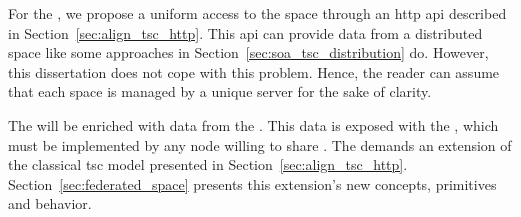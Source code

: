 For the \coordspace{}, we propose a uniform access to the space through an \acs{http} \ac{api} described in Section~\ref{sec:align_tsc_http}.
This \ac{api} can provide data from a distributed space like some approaches in Section~\ref{sec:soa_tsc_distribution} do.
However, this dissertation does not cope with this problem. %
Hence, the reader can assume that each space is managed by a unique server for the sake of clarity.


The \coordspace{} will be enriched with data from the \outerspace{}. %
This data is exposed with the \osapi{}, which must be implemented by any node willing to share \selfgraphs{}. %
The \outerspace{} demands an extension of the classical \ac{tsc} model presented in Section~\ref{sec:align_tsc_http}.
Section~\ref{sec:federated_space} presents this extension's new concepts, primitives and behavior.